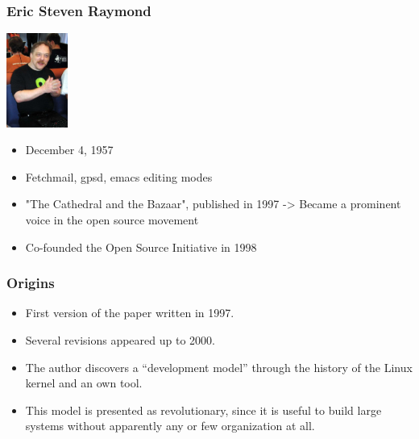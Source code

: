 \documentclass{beamer}
\begin{document}
\begin{frame}

\frametitle{Eric Steven Raymond}

\begin{center}
\includegraphics[width=2cm]{figs/EricrRaydmon.jpg}
\end{center}


\begin{itemize}
\item December 4, 1957
\item Fetchmail, gpsd, emacs editing modes
\item "The Cathedral and the Bazaar", published in 1997 -> Became a prominent voice in the open source movement 
\item Co-founded the Open Source Initiative in 1998

\end{itemize}

\end{frame}


\begin{frame}
\frametitle{Origins}

\begin{itemize}
\item First version of the paper written in 1997.
\item Several revisions appeared up to 2000.
\item The author discovers a ``development model'' through the history
  of the Linux kernel and an own tool.
\item This model is presented as revolutionary, since it is useful to
  build large systems without apparently any or few organization at all.
\end{itemize}

\end{frame}
\end{document}
